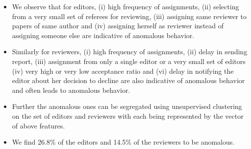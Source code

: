 \begin{itemize}
 \item We observe that for editors, (i) high frequency of assignments, (ii) selecting from a very small set of referees for reviewing, (iii) assigning same reviewer to papers of
same author and (iv) assigning herself as reviewer instead of assigning someone else are indicative of anomalous
behavior.

  \item Similarly for reviewers, (i) high frequency of assignments, (ii) delay in sending report, (iii) assignment
from only a single editor or a very small set of editors (iv) very high or very low acceptance ratio and (vi) delay in
notifying the editor about her decision to decline are also indicative of anomalous behavior and often leads to anomalous behavior.

 \item Further the anomalous ones can be segregated using unsupervised clustering on the set of editors and reviewers with each being represented by the vector of above features.
 
 \item We find 26.8\% of the editors and 14.5\% of the reviewers to be anomalous.
 
\end{itemize}


